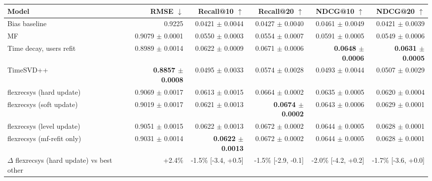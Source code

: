 \begin{tabular}{lrrrrr}
\toprule
Model & RMSE $\downarrow$ & Recall@10 $\uparrow$ & Recall@20 $\uparrow$ & NDCG@10 $\uparrow$ & NDCG@20 $\uparrow$ \\
\midrule
Bias baseline & 0.9225 & 0.0421 $\pm$ 0.0044 & 0.0427 $\pm$ 0.0040 & 0.0461 $\pm$ 0.0049 & 0.0421 $\pm$ 0.0039 \\
MF & 0.9079 $\pm$ 0.0001 & 0.0550 $\pm$ 0.0003 & 0.0554 $\pm$ 0.0007 & 0.0591 $\pm$ 0.0005 & 0.0549 $\pm$ 0.0006 \\
Time decay, users refit & 0.8989 $\pm$ 0.0014 & 0.0622 $\pm$ 0.0009 & 0.0671 $\pm$ 0.0006 & \textbf{0.0648 $\pm$ 0.0006} & \textbf{0.0631 $\pm$ 0.0005} \\
TimeSVD++ & \textbf{0.8857 $\pm$ 0.0008} & 0.0495 $\pm$ 0.0033 & 0.0574 $\pm$ 0.0028 & 0.0493 $\pm$ 0.0044 & 0.0507 $\pm$ 0.0029 \\
flexrecsys (hard update) & 0.9069 $\pm$ 0.0017 & 0.0613 $\pm$ 0.0015 & 0.0664 $\pm$ 0.0002 & 0.0635 $\pm$ 0.0005 & 0.0620 $\pm$ 0.0004 \\
flexrecsys (soft update) & 0.9019 $\pm$ 0.0017 & 0.0621 $\pm$ 0.0013 & \textbf{0.0674 $\pm$ 0.0002} & 0.0643 $\pm$ 0.0006 & 0.0629 $\pm$ 0.0001 \\
flexrecsys (level update) & 0.9051 $\pm$ 0.0015 & 0.0622 $\pm$ 0.0013 & 0.0672 $\pm$ 0.0002 & 0.0644 $\pm$ 0.0005 & 0.0628 $\pm$ 0.0001 \\
flexrecsys (mf-refit only) & 0.9031 $\pm$ 0.0014 & \textbf{0.0622 $\pm$ 0.0013} & 0.0672 $\pm$ 0.0002 & 0.0644 $\pm$ 0.0005 & 0.0628 $\pm$ 0.0001 \\
\midrule
$\Delta$ flexrecsys (hard update) vs best other & +2.4\% & -1.5\% [-3.4, +0.5] & -1.5\% [-2.9, -0.1] & -2.0\% [-4.2, +0.2] & -1.7\% [-3.6, +0.0] \\
\bottomrule
\end{tabular}
